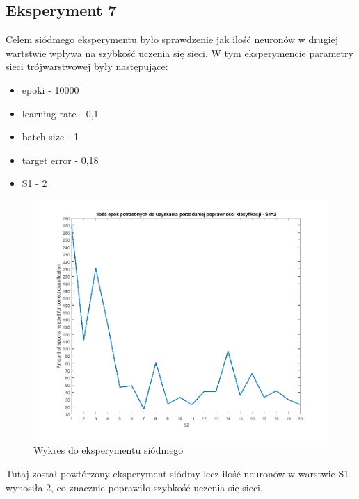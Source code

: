 \documentclass[12pt,twoside]{article}
\begin{document}
\subsection{Eksperyment 7}
Celem siódmego eksperymentu było sprawdzenie jak ilość neuronów w drugiej wartstwie wpływa na szybkość uczenia się sieci.
W tym eksperymencie parametry sieci trójwarstwowej były następujące:
\begin{itemize}
	\item epoki - 10000
	\item learning rate - 0,1
	\item batch size - 1
	\item target error - 0,18
	\item S1 - 2
\end{itemize}
\begin{figure}[ht!]
	\centering
	\includegraphics[width=15cm]{figures/S1=2_S2_epo.png}
	\caption{Wykres do eksperymentu siódmego}
\end{figure}
Tutaj został powtórzony eksperyment siódmy lecz ilość neuronów w warstwie S1 wynosiła 2, co znacznie poprawiło szybkość uczenia się sieci.
\newpage
\end{document}
